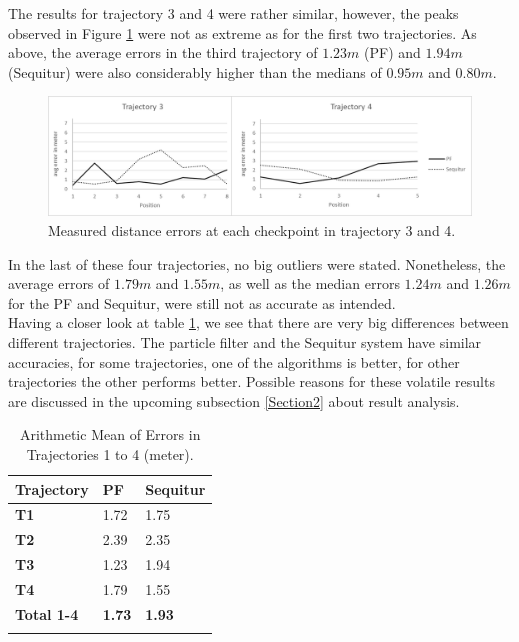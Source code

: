 The results for trajectory 3 and 4 were rather similar, however, the peaks observed in Figure \ref{fig:trajectory3and4_results} were not as extreme as for the first two trajectories. As above, the average errors in the third trajectory of $1.23m$ (PF) and $1.94m$ (Sequitur) were also considerably higher than the medians of $0.95m$ and $0.80m$.
\begin{figure}[th]
\centering
\includegraphics[width=1.0\textwidth]{Figures/trajectory3_4_results}
\decoRule
\caption[Localization Results of Trajectory 3 and 4]{Measured distance errors at each checkpoint in trajectory 3 and 4.}
\label{fig:trajectory3and4_results}
\end{figure}In the last of these four trajectories, no big outliers were stated. Nonetheless, the average errors of $1.79m$ and $1.55m$, as well as the median errors $1.24m$ and $1.26m$ for the PF and Sequitur, were still not as accurate as intended.\\
\noindent\hspace*{5mm}%
Having a closer look at table \ref{tab:arithmetic_errors}, we see that there are very big differences between different trajectories. The particle filter and the Sequitur system have similar accuracies, for some trajectories, one of the algorithms is better, for other trajectories the other performs better. Possible reasons for these volatile results are discussed in the upcoming subsection  \ref{Section2} about result analysis. 

\begin{table}
\caption{Arithmetic Mean of Errors in Trajectories 1 to 4 (meter).}
\label{tab:arithmetic_errors}
\centering
\begin{tabular}{l l l}
\toprule
\textbf{Trajectory} & \textbf{PF} & \textbf{Sequitur}\\
\midrule
\textbf{T1} & 1.72 & 1.75\\
\textbf{T2} & 2.39 & 2.35\\
\textbf{T3} & 1.23 & 1.94\\
\textbf{T4} & 1.79 & 1.55\\
\midrule
\textbf{Total 1-4}  & \textbf{1.73} & \textbf{1.93}\\
\bottomrule\\
\end{tabular}
\end{table}

